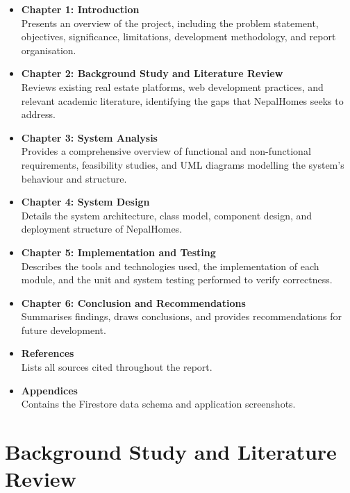 \documentclass[12pt,a4paper]{report}
\begin{document}
\begin{itemize}[leftmargin=2.5em]
  \item \textbf{Chapter 1: Introduction}\\
    Presents an overview of the project, including the problem statement,
    objectives, significance, limitations, development methodology, and report
    organisation.

  \item \textbf{Chapter 2: Background Study and Literature Review}\\
    Reviews existing real estate platforms, web development practices, and
    relevant academic literature, identifying the gaps that NepalHomes seeks
    to address.

  \item \textbf{Chapter 3: System Analysis}\\
    Provides a comprehensive overview of functional and non-functional
    requirements, feasibility studies, and UML diagrams modelling the system's
    behaviour and structure.

  \item \textbf{Chapter 4: System Design}\\
    Details the system architecture, class model, component design, and
    deployment structure of NepalHomes.

  \item \textbf{Chapter 5: Implementation and Testing}\\
    Describes the tools and technologies used, the implementation of each
    module, and the unit and system testing performed to verify correctness.

  \item \textbf{Chapter 6: Conclusion and Recommendations}\\
    Summarises findings, draws conclusions, and provides recommendations for
    future development.

  \item \textbf{References}\\
    Lists all sources cited throughout the report.

  \item \textbf{Appendices}\\
    Contains the Firestore data schema and application screenshots.
\end{itemize}

\chapter{Background Study and Literature Review}
\end{document}
